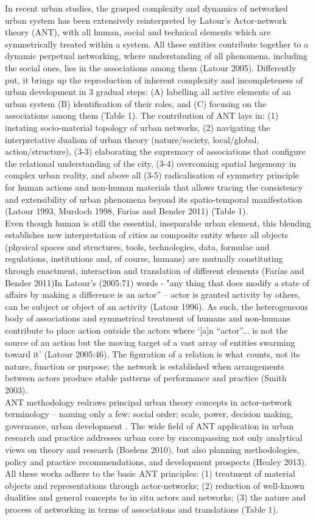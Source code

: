 \documentclass[11pt]{report}
\begin{document}
In recent urban studies, the grasped complexity and dynamics of networked urban system has been extensively reinterpreted by Latour’s Actor-network theory (ANT), with all human, social and technical elements which are symmetrically treated within a system. All these entities contribute together to a dynamic perpetual networking, where understanding of all phenomena, including the social ones, lies in the associations among them  (Latour 2005). Differently put, it brings up the reproduction of inherent complexity and incompleteness of urban development in 3 gradual steps:  (A) labelling all active elements of an urban system (B) identification of their roles, and (C) focusing on the associations among them (Table 1). The contribution of ANT lays in: (1) instating socio-material topology of urban networks, (2) navigating the interpretative dualism of urban theory (nature/society, local/global, action/structure), (3-3) elaborating the supremacy of associations that configure the relational understanding of the city, (3-4) overcoming spatial hegemony in complex urban reality, and above all (3-5) radicalisation of  symmetry principle for human  actions  and non-human  materials  that  allows tracing the consistency and extensibility of urban phenomena beyond its spatio-temporal manifestation  (Latour 1993, Murdoch 1998, Farias and Bender 2011) (Table 1).
\\
Even though human is still the essential, inseparable urban element, this blending establishes new interpretation of cities as composite entity where all objects (physical spaces and structures, tools, technologies, data, formulae and regulations, institutions and, of course, humans) are mutually constituting through enactment, interaction and translation of different elements (Farías and Bender 2011)In  Latour’s (2005:71) words - "any thing that does modify a state of affairs by making a difference is an actor” – actor is granted activity by others, can be subject or object of an activity  (Latour 1996). As such, the heterogeneous body of associations and symmetrical treatment of humans and non-humans contribute to place action outside the actors where ‘[a]n “actor”... is not the source of an action but the moving target of a vast array of entities swarming toward it’ (Latour 2005:46). The figuration of a relation is what counts, not its nature, function or purpose; the network is established when arrangements between actors produce stable patterns of performance and practice (Smith 2003).
\\
ANT methodology redraws principal urban theory concepts in actor-network terminology – naming only a few: social order; scale, power, decision making, governance, urban development . The wide field of ANT application in urban research and practice addresses urban core by encompassing not only analytical views on theory and research (Boelens 2010), but also planning methodologies, policy and practice recommendations, and development prospects (Healey 2013). All these works adhere to the basic ANT principles: (1) treatment of material objects and representations through actor-networks; (2) reduction of well-known dualities and general concepts to in situ actors and networks; (3) the nature and process of networking in terms of associations and translations (Table 1).
\end{document}
